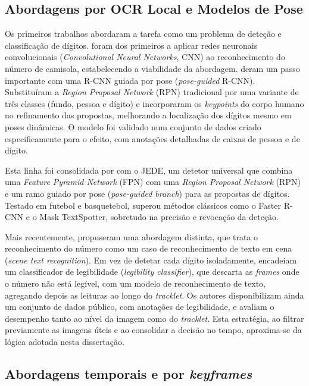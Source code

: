 \subsection{Abordagens por OCR Local e Modelos de Pose}

Os primeiros trabalhos abordaram a tarefa como um problema de deteção e classificação de dígitos. \citet{gerke2015soccer} foram dos primeiros a aplicar redes neuronais convolucionais (\emph{Convolutional Neural Networks}, CNN) ao reconhecimento do número de camisola, estabelecendo a viabilidade da abordagem. \citet{liu2019poseguided} deram um passo importante com uma R-CNN guiada por pose (\emph{pose-guided} R-CNN). Substituíram a \emph{Region Proposal Network} (RPN) tradicional por uma variante de três classes (fundo, pessoa e dígito) e incorporaram os \emph{keypoints} do corpo humano no refinamento das propostas, melhorando a localização dos dígitos mesmo em poses dinâmicas. O modelo foi validado num conjunto de dados criado especificamente para o efeito, com anotações detalhadas de caixas de pessoa e de dígito.

Esta linha foi consolidada por \citet{liu2022jede} com o JEDE, um detetor universal que combina uma \emph{Feature Pyramid Network} (FPN) com uma \emph{Region Proposal Network} (RPN) e um ramo guiado por pose (\emph{pose-guided branch}) para as propostas de dígitos. Testado em futebol e basquetebol, superou métodos clássicos como o Faster R-CNN e o Mask TextSpotter, sobretudo na precisão e revocação da deteção.

Mais recentemente, \citet{koshkina2024general} propuseram uma abordagem distinta, que trata o reconhecimento do número como um caso de reconhecimento de texto em cena (\emph{scene text recognition}). Em vez de detetar cada dígito isoladamente, encadeiam um classificador de legibilidade (\emph{legibility classifier}), que descarta as \emph{frames} onde o número não está legível, com um modelo de reconhecimento de texto, agregando depois as leituras ao longo do \emph{tracklet}. Os autores disponibilizam ainda um conjunto de dados público, com anotações de legibilidade, e avaliam o desempenho tanto ao nível da imagem como do \emph{tracklet}. Esta estratégia, ao filtrar previamente as imagens úteis e ao consolidar a decisão no tempo, aproxima-se da lógica adotada nesta dissertação.

\subsection{Abordagens temporais e por \emph{keyframes}}

